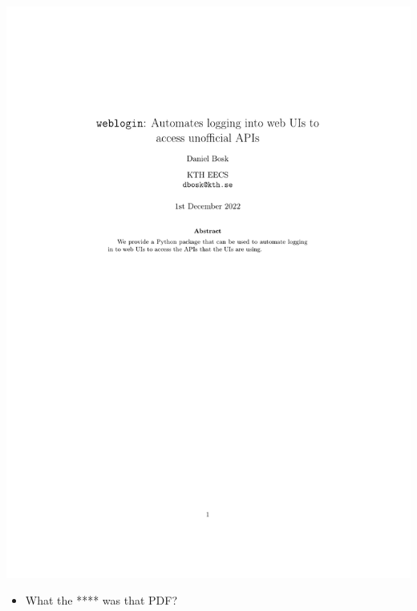 \begin{frame}
  \vspace{-2cm}
  \includegraphics[page=1,width=\textwidth]{figs/weblogin.pdf}
  \vspace{-\textheight}
  \vspace{-2em}
  \begin{question}
    \begin{itemize}
      \item What the **** was that PDF?
    \end{itemize}
  \end{question}
\end{frame}

